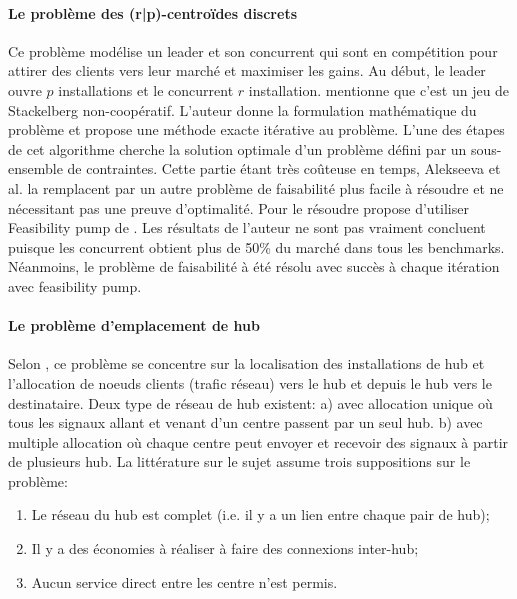 \documentclass[12pt,a4paper,oneside]{book}
\theoremstyle{definition}
\begin{document}
	    \paragraph{Le problème des (r|p)-centroïdes discrets}
	    
	    Ce problème modélise un leader et son concurrent qui sont en compétition pour attirer des clients vers leur marché et maximiser les gains. Au début, le leader ouvre $p$ installations et le concurrent $r$ installation. \cite{Alekseeva2010} mentionne que c'est un jeu de Stackelberg non-coopératif. L'auteur donne la formulation mathématique du problème et propose une méthode exacte itérative au problème. L'une des étapes de cet algorithme cherche la solution optimale d'un problème défini par un sous-ensemble de contraintes. Cette partie étant très coûteuse en temps, Alekseeva et al. la remplacent par un autre problème de faisabilité plus facile à résoudre et ne nécessitant pas une preuve d'optimalité. Pour le résoudre \cite{Alekseeva2010} propose d'utiliser Feasibility pump de \cite{Fischetti2005}. Les résultats de l'auteur ne sont pas vraiment concluent puisque les concurrent obtient plus de 50\% du marché dans tous les benchmarks. Néanmoins, le problème de faisabilité à été résolu avec succès à chaque itération avec feasibility pump.
	    
	    \paragraph{Le problème d'emplacement de hub}
            
            Selon \cite{Alumur2008}, ce problème se concentre sur la localisation des installations de hub et l'allocation de noeuds clients (trafic réseau) vers le hub et depuis le hub vers le destinataire.  Deux type de réseau de hub existent: a) avec allocation unique où tous les signaux allant et venant d'un centre passent par un seul hub. b) avec multiple allocation où chaque centre peut envoyer et recevoir des signaux à partir de plusieurs hub. La littérature sur le sujet assume trois suppositions sur le problème:
            \begin{enumerate}
                \item Le réseau du hub est complet (i.e. il y a un lien entre chaque pair de hub);
                \item Il y a des économies à réaliser à faire des connexions inter-hub;
                \item Aucun service direct entre les centre n'est permis.
            \end{enumerate}
            
\end{document}
